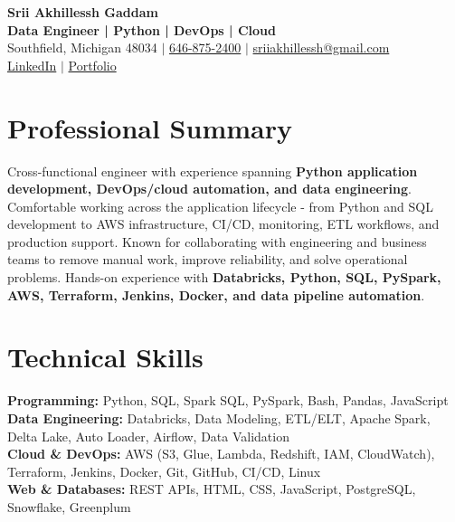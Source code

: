 \documentclass[letterpaper,10pt]{article}
\begin{document}
\fontsize{9.35pt}{10.45pt}\selectfont

\begin{center}
    {\LARGE \textbf{Srii Akhillessh Gaddam}} \\[-1pt]
    \textbf{Data Engineer | Python | DevOps | Cloud} \\[2pt]
    Southfield, Michigan 48034 $|$
    \href{tel:6468752400}{646-875-2400} $|$
    \href{mailto:sriiakhillessh@gmail.com}{sriiakhillessh@gmail.com} \\[1pt]
    \href{https://www.linkedin.com/in/srii-akhiilessh-gaddam-b48668191/}{LinkedIn} $|$
    \href{https://sriiakhillesshg.github.io/portfolio/}{Portfolio}
\end{center}
\vspace{-8pt}

\section{Professional Summary}
\small{Cross-functional engineer with experience spanning \textbf{Python application development, DevOps/cloud automation, and data engineering}. Comfortable working across the application lifecycle - from Python and SQL development to AWS infrastructure, CI/CD, monitoring, ETL workflows, and production support. Known for collaborating with engineering and business teams to remove manual work, improve reliability, and solve operational problems. Hands-on experience with \textbf{Databricks, Python, SQL, PySpark, AWS, Terraform, Jenkins, Docker, and data pipeline automation}.}

\section{Technical Skills}
\small{
\textbf{Programming:} Python, SQL, Spark SQL, PySpark, Bash, Pandas, JavaScript \\
\textbf{Data Engineering:} Databricks, Data Modeling, ETL/ELT, Apache Spark, Delta Lake, Auto Loader, Airflow, Data Validation \\
\textbf{Cloud \& DevOps:} AWS (S3, Glue, Lambda, Redshift, IAM, CloudWatch), Terraform, Jenkins, Docker, Git, GitHub, CI/CD, Linux \\
\textbf{Web \& Databases:} REST APIs, HTML, CSS, JavaScript, PostgreSQL, Snowflake, Greenplum
}

\end{document}
